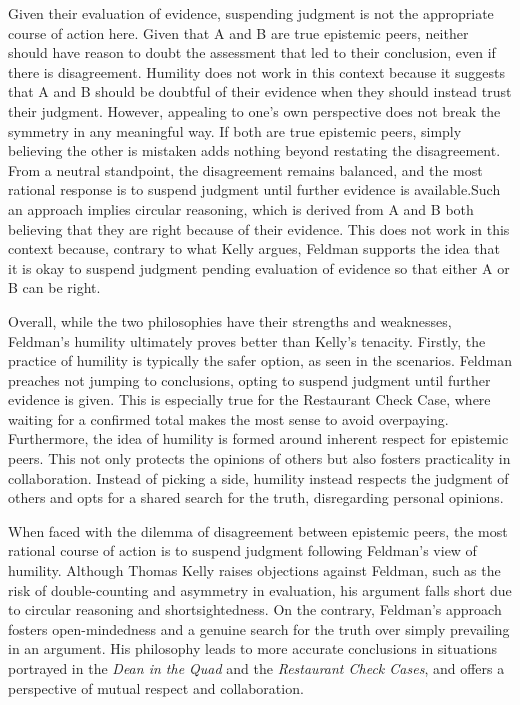 \documentclass[12pt, a4paper, twoside]{article}
\begin{document}
Given their evaluation of evidence, suspending judgment is not the appropriate course of action here. Given that A and B are true epistemic peers, neither should have reason to doubt the assessment that led to their conclusion, even if there is disagreement. Humility does not work in this context because it suggests that A and B should be doubtful of their evidence when they should instead trust their judgment. However, appealing to one’s own perspective does not break the symmetry in any meaningful way. If both are true epistemic peers, simply believing the other is mistaken adds nothing beyond restating the disagreement. From a neutral standpoint, the disagreement remains balanced, and the most rational response is to suspend judgment until further evidence is available.Such an approach implies circular reasoning, which is derived from A and B both believing that they are right because of their evidence. This does not work in this context because, contrary to what Kelly argues, Feldman supports the idea that it is okay to suspend judgment pending evaluation of evidence so that either A or B can be right.

Overall, while the two philosophies have their strengths and weaknesses, Feldman’s humility ultimately proves better than Kelly’s tenacity. Firstly, the practice of humility is typically the safer option, as seen in the scenarios. Feldman preaches not jumping to conclusions, opting to suspend judgment until further evidence is given. This is especially true for the Restaurant Check Case, where waiting for a confirmed total makes the most sense to avoid overpaying. Furthermore, the idea of humility is formed around inherent respect for epistemic peers. This not only protects the opinions of others but also fosters practicality in collaboration. Instead of picking a side, humility instead respects the judgment of others and opts for a shared search for the truth, disregarding personal opinions. 

When faced with the dilemma of disagreement between epistemic peers, the most rational course of action is to suspend judgment following Feldman’s view of humility. Although Thomas Kelly raises objections against Feldman, such as the risk of double-counting and asymmetry in evaluation, his argument falls short due to circular reasoning and shortsightedness. On the contrary, Feldman’s approach fosters open-mindedness and a genuine search for the truth over simply prevailing in an argument. His philosophy leads to more accurate conclusions in situations portrayed in the \emph{Dean in the Quad} and the \emph{Restaurant Check Cases}, and offers a perspective of mutual respect and collaboration. 








\printbibliography
\end{document}
